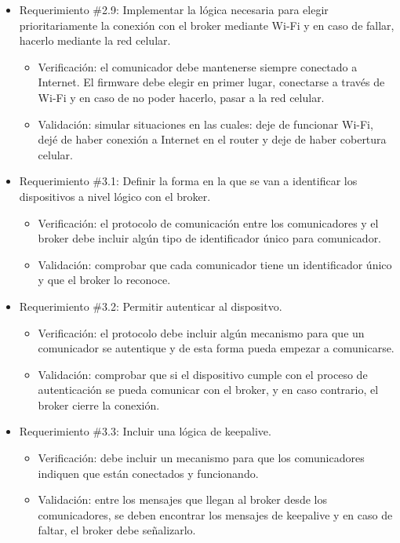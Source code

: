 \documentclass[
11pt, %
codirector, %
]{charter}
\begin{document}
\begin{itemize}
	\item Requerimiento \#2.9: Implementar la lógica necesaria para elegir prioritariamente la conexión con el broker mediante Wi-Fi y en caso de fallar, hacerlo mediante la red celular.
	\begin{itemize}
		\item Verificación: el comunicador debe mantenerse siempre conectado a Internet. El firmware debe elegir en primer lugar, conectarse a través de Wi-Fi y en caso de no poder hacerlo, pasar a la red celular.
		\item Validación: simular situaciones en las cuales: deje de funcionar Wi-Fi, dejé de haber conexión a Internet en el router y deje de haber cobertura celular.
	\end{itemize}
			
	\item Requerimiento \#3.1: Definir la forma en la que se van a identificar los dispositivos a nivel lógico con el broker.
	\begin{itemize}
		\item Verificación: el protocolo de comunicación entre los comunicadores y el broker debe incluir algún tipo de identificador único para comunicador.
		\item Validación: comprobar que cada comunicador tiene un identificador único y que el broker lo reconoce.
	\end{itemize}
			
	\item Requerimiento \#3.2: Permitir autenticar al dispositvo.
	\begin{itemize}
		\item Verificación: el protocolo debe incluir algún mecanismo para que un comunicador se autentique y de esta forma pueda empezar a comunicarse.
		\item Validación: comprobar que si el dispositivo cumple con el proceso de autenticación se pueda comunicar con el broker, y en caso contrario, el broker cierre la conexión.
	\end{itemize}
			
	\item Requerimiento \#3.3: Incluir una lógica de keepalive.
	\begin{itemize}
		\item Verificación: debe incluir un mecanismo para que los comunicadores indiquen que están conectados y funcionando.
		\item Validación: entre los mensajes que llegan al broker desde los comunicadores, se deben encontrar los mensajes de keepalive y en caso de faltar, el broker debe señalizarlo.
	\end{itemize}
			

\end{itemize}
\end{document}
